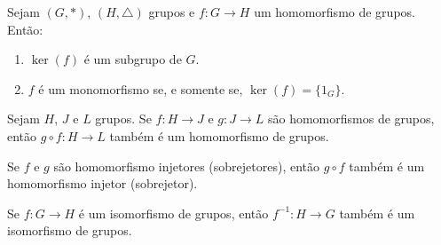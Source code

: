 \documentclass{beamer}
\begin{document}
    \begin{frame}
        \begin{proposicao}
            Sejam $(G, *)$, \pause $(H, \triangle)$ grupos \pause e $f : G \to H$ um homomorfismo de grupos. \pause Então: \pause
            \vspace{.5cm}

            \begin{enumerate}[label={\roman*})]
                \item $\ker(f)$ é um subgrupo de $G$. \pause

                \vspace{.5cm}

                \item $f$ é um monomorfismo se, e somente se, $\ker(f) = \{1_G\}$.

                \vspace{.5cm}
            \end{enumerate}
        \end{proposicao}
    \end{frame}

    \begin{frame}
        \begin{proposicao}
            Sejam $H$, $J$ e $L$ grupos. \pause Se $f : H \to J$ \pause e $g : J \to L$ \pause são homomorfismos de grupos, \pause então $g \circ f : H \to L$ \pause também é um homomorfismo de grupos.
        \end{proposicao}
        \vspace{2cm}
    \end{frame}

    \begin{frame}
        \begin{corolario}
            Se $f$ e $g$ são homomorfismo \pause injetores \pause (sobrejetores), então $g \circ f$ \pause também é um homomorfismo injetor \pause (sobrejetor).
        \end{corolario}
        \vspace{2cm}
    \end{frame}

    \begin{frame}
        \begin{proposicao}
            Se $f : G \to H$ é um isomorfismo de grupos, \pause então $f^{-1} : H \to G$ \pause também é um isomorfismo de grupos.
        \end{proposicao}
    \end{frame}
\end{document}
